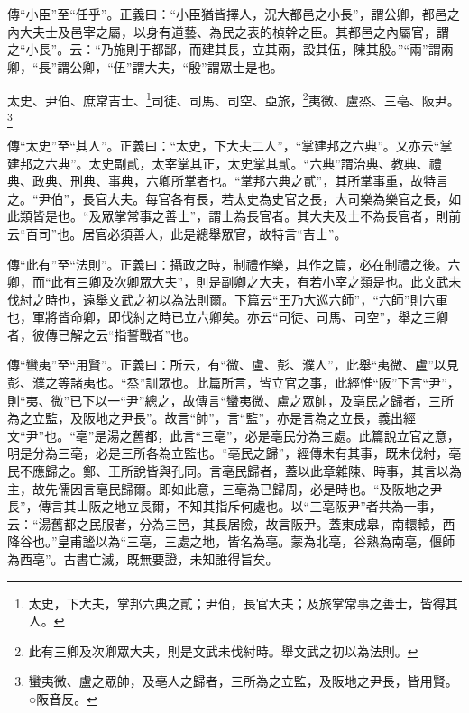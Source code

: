 {\noindent\zhuan{}\fzbyks 傳“小臣”至“任乎”。正義曰：“小臣猶皆擇人，況大都邑之小長”，謂公卿，都邑之內大夫士及邑宰之屬，以身有道藝、為民之表的楨幹之臣。其都邑之內屬官，謂之“小長”。云：“乃施則于都鄙，而建其長，立其兩，設其伍，陳其殷。”“兩”謂兩卿，“長”謂公卿，“伍”謂大夫，“殷”謂眾士是也。 \par}

太史、尹伯、庶常吉士、\footnote{太史，下大夫，掌邦六典之貳；尹伯，長官大夫；及旅掌常事之善士，皆得其人。}司徒、司馬、司空、亞旅，\footnote{此有三卿及次卿眾大夫，則是文武未伐紂時。舉文武之初以為法則。}夷微、盧烝、三亳、阪尹。\footnote{蠻夷微、盧之眾帥，及亳人之歸者，三所為之立監，及阪地之尹長，皆用賢。○阪音反。}

{\noindent\zhuan{}\fzbyks 傳“太史”至“其人”。正義曰：“太史，下大夫二人”，“掌建邦之六典”。又亦云“掌建邦之六典”。太史副貳，太宰掌其正，太史掌其貳。“六典”謂治典、教典、禮典、政典、刑典、事典，六卿所掌者也。“掌邦六典之貳”，其所掌事重，故特言之。“尹伯”，長官大夫。每官各有長，若太史為史官之長，大司樂為樂官之長，如此類皆是也。“及眾掌常事之善士”，謂士為長官者。其大夫及士不為長官者，則前云“百司”也。居官必須善人，此是總舉眾官，故特言“吉士”。 \par}

{\noindent\zhuan{}\fzbyks 傳“此有”至“法則”。正義曰：攝政之時，制禮作樂，其作之篇，必在制禮之後。六卿，而“此有三卿及次卿眾大夫”，則是副卿之大夫，有若小宰之類是也。此文武未伐紂之時也，遠舉文武之初以為法則爾。下篇云“王乃大巡六師”，“六師”則六軍也，軍將皆命卿，即伐紂之時已立六卿矣。亦云“司徒、司馬、司空”，舉之三卿者，彼傳已解之云“指誓戰者”也。 \par}

{\noindent\zhuan{}\fzbyks 傳“蠻夷”至“用賢”。正義曰：所云，有“微、盧、彭、濮人”，此舉“夷微、盧”以見彭、濮之等諸夷也。“烝”訓眾也。此篇所言，皆立官之事，此經惟“阪”下言“尹”，則“夷、微”已下以一“尹”總之，故傳言“蠻夷微、盧之眾帥，及亳民之歸者，三所為之立監，及阪地之尹長”。故言“帥”，言“監”，亦是言為之立長，義出經文“尹”也。“亳”是湯之舊都，此言“三亳”，必是亳民分為三處。此篇說立官之意，明是分為三亳，必是三所各為立監也。“亳民之歸”，經傳未有其事，既未伐紂，亳民不應歸之。鄭、王所說皆與孔同。言亳民歸者，蓋以此章雜陳、時事，其言以為主，故先儒因言亳民歸爾。即如此意，三亳為已歸周，必是時也。“及阪地之尹長”，傳言其山阪之地立長爾，不知其指斥何處也。以“三亳阪尹”者共為一事，云：“湯舊都之民服者，分為三邑，其長居險，故言阪尹。蓋東成皋，南轘轅，西降谷也。”皇甫謐以為“三亳，三處之地，皆名為亳。蒙為北亳，谷熟為南亳，偃師為西亳”。古書亡滅，既無要證，未知誰得旨矣。 \par}

